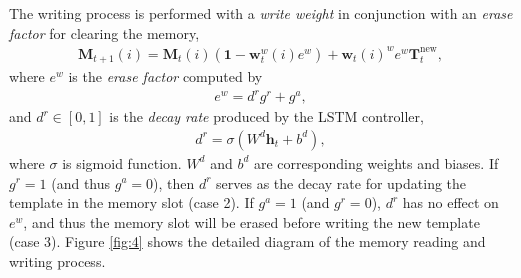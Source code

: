 \documentclass[runningheads]{llncs}
\begin{document}
The writing process is performed with a \textit{write weight} in conjunction with an \textit{erase factor} for clearing the memory, 
\begin{align}
\mathbf{M}_{t+1}(i) = \mathbf{M}_{t}(i)(\mathbf{1}-\mathbf{w}^w_t(i)e^w)+\mathbf{w}_t(i)^we^w\mathbf{T}^{\text{new}}_t,
\end{align}
where %
$e^w$ is the \textit{erase factor} computed by
\begin{align}
e^w = d^rg^r+g^a,
\end{align}
and $d^r \in [0,1]$ is the \textit{decay rate} produced by the LSTM controller, 
\begin{align}
d^r = \sigma (W^d\mathbf{h}_{t}+b^d),
\end{align}
where $\sigma$ is sigmoid function. $W^d$ and $b^d$ are corresponding weights and biases. If $g^r=1$ (and thus $g^a=0$), then $d^r$ serves as the decay rate for updating the template in the memory slot (case 2). If $g^a=1$ (and $g^r=0$), $d^r$ has no effect on $e^w$, and thus the memory slot will be erased before writing the new template (case 3). Figure \ref{fig:4} shows the detailed diagram of the memory reading and writing process.
\end{document}
